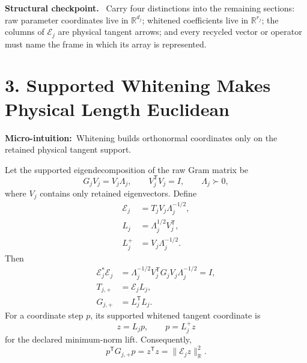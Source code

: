\documentclass[10pt,twocolumn]{article}
\newcommand{\micro}[1]{\par\noindent\textbf{Micro-intuition:}\ #1\par}
\newenvironment{insight}{\begin{center}\begin{minipage}{0.94\columnwidth}\color{blue!35!black}\textbf{Structural checkpoint.}\ }{\end{minipage}\end{center}}
\begin{document}
\begin{insight}
Carry four distinctions into the remaining sections: raw parameter coordinates
live in \(\mathbb R^{d_j}\); whitened coefficients live in
\(\mathbb R^{r_j}\); the columns of \(\mathcal E_j\) are physical tangent
arrows; and every recycled vector or operator must name the frame in which its
array is represented.
\end{insight}

\clearpage

\section*{3. Supported Whitening Makes Physical Length Euclidean}

\micro{Whitening builds orthonormal coordinates only on the retained physical
tangent support.}

Let the supported eigendecomposition of the raw Gram matrix be
\begin{equation}
G_jV_j=V_j\Lambda_j,
\qquad
V_j^{\mathsf T}V_j=I,
\qquad
\Lambda_j\succ0,
\label{eq:supported-spectrum}
\end{equation}
where \(V_j\) contains only retained eigenvectors. Define
\begin{align}
\mathcal E_j
&=T_jV_j\Lambda_j^{-1/2},
\label{eq:orthonormal-frame}\\
L_j
&=\Lambda_j^{1/2}V_j^{\mathsf T},
\label{eq:coordinate-frame-map}\\
L_j^+
&=V_j\Lambda_j^{-1/2}.
\label{eq:frame-coordinate-lift}
\end{align}
Then
\begin{align}
\mathcal E_j^*\mathcal E_j
&=\Lambda_j^{-1/2}V_j^{\mathsf T}G_jV_j
\Lambda_j^{-1/2}=I,
\label{eq:whitened-identity}\\
T_{j,+}&=\mathcal E_jL_j,
\label{eq:tangent-factorization}\\
G_{j,+}&=L_j^{\mathsf T}L_j.
\label{eq:gram-factorization}
\end{align}
For a coordinate step \(p\), its supported whitened tangent coordinate is
\begin{equation}
z=L_jp,
\qquad
p=L_j^+z
\label{eq:whitened-coordinate}
\end{equation}
for the declared minimum-norm lift. Consequently,
\begin{equation}
p^{\mathsf T}G_{j,+}p
=z^{\mathsf T}z
=\|\mathcal E_jz\|_{\mathbb R}^2.
\label{eq:identity-metric}
\end{equation}
\end{document}
